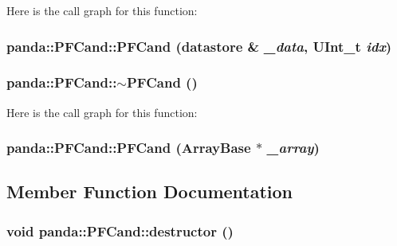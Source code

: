 Here is the call graph for this function:\hypertarget{classpanda_1_1PFCand_a3cc3d580fa70ef5e61b72f35ca246585}{
\subsubsection[{PFCand}]{\setlength{\rightskip}{0pt plus 5cm}panda::PFCand::PFCand ({\bf datastore} \& {\em \_\-data}, \/  UInt\_\-t {\em idx})}}
\label{classpanda_1_1PFCand_a3cc3d580fa70ef5e61b72f35ca246585}
\hypertarget{classpanda_1_1PFCand_a3e01d8aefa63f555e73e160d9e585984}{
\subsubsection[{$\sim$PFCand}]{\setlength{\rightskip}{0pt plus 5cm}panda::PFCand::$\sim$PFCand ()}}
\label{classpanda_1_1PFCand_a3e01d8aefa63f555e73e160d9e585984}


Here is the call graph for this function:\hypertarget{classpanda_1_1PFCand_a4dd4be41d1ae3bceea589c14d074a062}{
\subsubsection[{PFCand}]{\setlength{\rightskip}{0pt plus 5cm}panda::PFCand::PFCand ({\bf ArrayBase} $\ast$ {\em \_\-array})}}
\label{classpanda_1_1PFCand_a4dd4be41d1ae3bceea589c14d074a062}


\subsection{Member Function Documentation}
\hypertarget{classpanda_1_1PFCand_a30a87718470988f020ce75d7e990868b}{
\subsubsection[{destructor}]{\setlength{\rightskip}{0pt plus 5cm}void panda::PFCand::destructor ()}}
\label{classpanda_1_1PFCand_a30a87718470988f020ce75d7e990868b}


